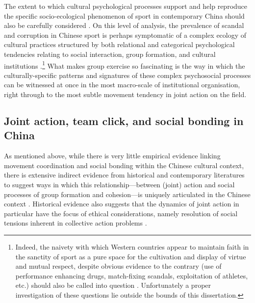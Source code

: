 The extent to which cultural psychological processes support and help reproduce the specific socio-ecological phenomenon of sport in contemporary China should also be carefully considered \citep{Sperber1996,Nisbett2003}.  On this level of analysis, the prevalence of scandal and corruption in Chinese sport is perhaps symptomatic of a complex ecology of cultural practices structured by both relational and categorical psychological tendencies relating to social interaction, group formation, and cultural institutions \citep{Nisbett2003,Yuki2005,Liu2009}.\footnote{Indeed, the naivety with which Western countries appear to maintain faith in the sanctity of sport as a pure space for the cultivation and display of virtue and mutual respect, despite obvious evidence to the contrary (use of performance enhancing drugs, match-fixing scandals, exploitation of athletes, etc.) should also be called into question \citep{Southall2017}.  Unfortunately a proper investigation of these questions lie outside the bounds of this dissertation.} What makes group exercise so fascinating is the way in which the culturally-specific patterns and signatures of these complex psychosocial processes can be witnessed at once in the most macro-scale of institutional organisation, right through to the most subtle movement tendency in joint action on the field.




\subsection{Joint action, team click, and social bonding in China}
As mentioned above, while there is very little empirical evidence linking movement coordination and social bonding within the Chinese cultural context, there is extensive indirect evidence from historical and contemporary literatures to suggest ways in which this relationship---between (joint) action and social processes of group formation and cohesion---is uniquely articulated in the Chinese context \citep{Weed2011}.  Historical evidence also suggests that the dynamics of joint action in particular have the focus of ethical considerations, namely resolution of social tensions inherent in collective action problems \citep{Slingerland2014}.

